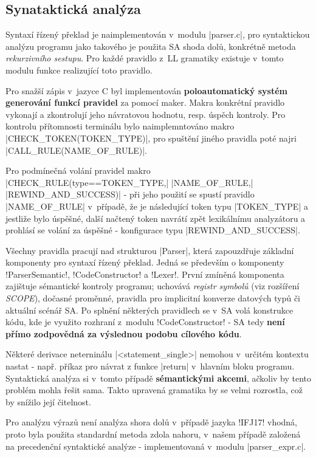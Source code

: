 \subsection{Synataktická analýza}
Syntaxí řízený překlad je naimplementován v~modulu \ic|parser.c|, pro syntaktickou analýzu programu jako takového je
použita SA shoda dolů, konkrétně metoda \emph{rekurzivního sestupu}. Pro každé pravidlo z~LL gramatiky existuje v~tomto
modulu funkce realizující toto pravidlo.

Pro snažší zápis v~jazyce C byl implementován \textbf{poloautomatický systém generování funkcí pravidel} za pomocí maker.
Makra konkrétní pravidlo vykonají a zkontrolují jeho návratovou hodnotu, resp. úspěch kontroly. Pro kontrolu přítomnosti terminálu bylo
naimplemntováno makro \ic|CHECK_TOKEN(TOKEN_TYPE)|, pro spuštění jiného pravidla poté najri
\ic|CALL_RULE(NAME_OF_RULE)|.

Pro podmínečná volání pravidel makro
\ic|CHECK_RULE(type==TOKEN_TYPE,| \ic|NAME_OF_RULE,| \ic|REWIND_AND_SUCCESS)| - při jeho použití se spustí pravidlo
\ic|NAME_OF_RULE| v~případě, že je následující token typu \ic|TOKEN_TYPE| a jestliže bylo úspěšné, další načtený
token navrátí zpět lexikálnímu analyzátoru a prohlásí se volání za úspěšné - konfigurace typu \ic|REWIND_AND_SUCCESS|.

Všechny pravidla pracují nad strukturou \ic|Parser|, která zapouzdřuje základní komponenty pro syntaxí řízený překlad.
Jedná se především o komponenty \ic!ParserSemantic!, \ic!CodeConstructor! a \ic!Lexer!. První zmíněná komponenta zajištuje sémantické
kontroly programu; uchovává \emph{registr symbolů} (viz rozšíření \emph{SCOPE}), dočasné proměnné, pravidla pro implicitní konverze datových typů či
aktuální scénář SA. Po splnění některých pravidlech se v~SA volá konstrukce kódu, kde je využito rozhraní z~modulu \ic!CodeConstructor! - SA tedy \textbf{není přímo zodpovědná za výslednou podobu cílového kódu}.

Některé derivace neterninálu \ic|<statement_single>| nemohou v~určitém kontextu nastat
- např. příkaz pro návrat z funkce \ic|return| v~hlavním bloku programu. Syntaktická analýza si v~tomto případě  \textbf{sémantickými akcemi}, ačkoliv by tento problém mohla řešit sama. Takto upravená gramatika by se velmi rozrostla, což by snížilo její čitelnost.

Pro analýzu výrazů není analýza shora dolů v~případě jazyka \ic!IFJ17! vhodná, proto byla
použita standardní metoda zdola nahoru, v~našem případě založená na precedenční
syntaktické analýze - implementovaná v~modulu \ic|parser_expr.c|.

